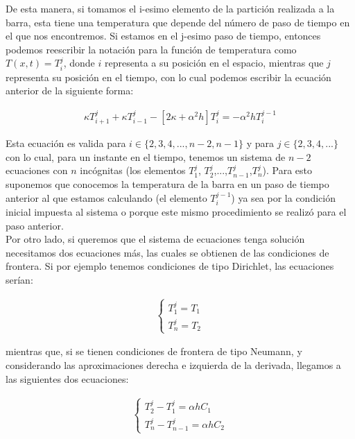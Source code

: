 \documentclass[12pt]{article}
\begin{document}
De esta manera, si tomamos el i-esimo elemento de la partición realizada a la barra, esta tiene una temperatura que depende del número de paso de tiempo en el que nos encontremos. Si estamos en el j-esimo paso de tiempo, entonces podemos reescribir la notación para la función de temperatura como $T(x,t) = T_i^j$, donde $i$ representa a su posición en el espacio, mientras que $j$ representa su posición en el tiempo, con lo cual podemos escribir la ecuación anterior de la siguiente forma:

\begin{align}
    \kappa T_{i+1}^j + \kappa T_{i-1}^j - [2\kappa + \alpha^2 h]T_i^j = -\alpha^2 h T_i^{j-1}
\end{align}

Esta ecuación es valida para $i \in \{2,3,4,...,n-2,n-1\}$ y para $j \in \{ 2,3,4,... \}$ con lo cual, para un instante en el tiempo, tenemos un sistema de $n-2$ ecuaciones con $n$ incógnitas (los elementos $T_1^j$, $T_2^j$,...,$T_{n-1}^j$,$T_n^j$). Para esto suponemos que conocemos la temperatura de la barra en un paso de tiempo anterior al que estamos calculando (el elemento $T_i^{j-1}$) ya sea por la condición inicial impuesta al sistema o porque este mismo procedimiento se realizó para el paso anterior. \\

Por otro lado, si queremos que el sistema de ecuaciones tenga solución necesitamos dos ecuaciones más, las cuales se obtienen de las condiciones de frontera. Si por ejemplo tenemos condiciones de tipo Dirichlet, las ecuaciones serían:

\begin{align}
    \begin{cases}
        T_1^j = T_1\\
        T_n^j = T_2
    \end{cases}
\end{align}

mientras que, si se tienen condiciones de frontera de tipo Neumann, y considerando las aproximaciones derecha e izquierda de la derivada, llegamos a las siguientes dos ecuaciones:

\begin{align}
    \begin{cases}
        T_2^j - T_1^j = \alpha hC_1\\
        T_n^j - T_{n-1}^j = \alpha hC_2
    \end{cases}
\end{align}
\end{document}

